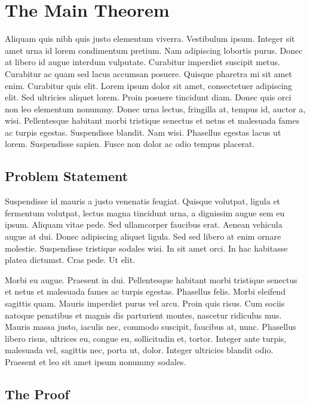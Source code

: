 \documentclass[a4paper,11pt]{kth-mag}
\begin{document}
\section{The Main Theorem}

Aliquam quis nibh quis justo elementum viverra. Vestibulum ipsum.
Integer sit amet urna id lorem condimentum pretium. Nam adipiscing
lobortis purus. Donec at libero id augue interdum vulputate. Curabitur
imperdiet suscipit metus. Curabitur ac quam sed lacus accumsan
posuere. Quisque pharetra mi sit amet enim. Curabitur quis elit. Lorem
ipsum dolor sit amet, consectetuer adipiscing elit. Sed ultricies
aliquet lorem. Proin posuere tincidunt diam. Donec quis orci non leo
elementum nonummy. Donec urna lectus, fringilla at, tempus id, auctor
a, wisi. Pellentesque habitant morbi tristique senectus et netus et
malesuada fames ac turpis egestas. Suspendisse blandit. Nam wisi.
Phasellus egestas lacus ut lorem. Suspendisse sapien. Fusce non dolor
ac odio tempus placerat.

\subsection{Problem Statement}

Suspendisse id mauris a justo venenatis feugiat. Quisque volutpat,
ligula et fermentum volutpat, lectus magna tincidunt urna, a dignissim
augue sem eu ipsum. Aliquam vitae pede. Sed ullamcorper faucibus erat.
Aenean vehicula augue at dui. Donec adipiscing aliquet ligula. Sed sed
libero at enim ornare molestie. Suspendisse tristique sodales wisi. In
sit amet orci. In hac habitasse platea dictumst. Cras pede. Ut elit.

Morbi eu augue. Praesent in dui. Pellentesque habitant morbi tristique
senectus et netus et malesuada fames ac turpis egestas. Phasellus
felis. Morbi eleifend sagittis quam. Mauris imperdiet purus vel arcu.
Proin quis risus. Cum sociis natoque penatibus et magnis dis
parturient montes, nascetur ridiculus mus. Mauris massa justo, iaculis
nec, commodo suscipit, faucibus at, nunc. Phasellus libero risus,
ultrices eu, congue eu, sollicitudin et, tortor. Integer ante turpis,
malesuada vel, sagittis nec, porta ut, dolor. Integer ultricies
blandit odio. Praesent et leo sit amet ipsum nonummy sodales.

\subsection{The Proof}
\end{document}
